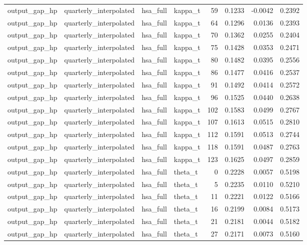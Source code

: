 \begin{tabular}{llllrrrr}
output\_gap\_hp & quarterly\_interpolated & hsa\_full & kappa\_t & 59 & 0.1233 & -0.0042 & 0.2392 \\
output\_gap\_hp & quarterly\_interpolated & hsa\_full & kappa\_t & 64 & 0.1296 & 0.0136 & 0.2393 \\
output\_gap\_hp & quarterly\_interpolated & hsa\_full & kappa\_t & 70 & 0.1362 & 0.0255 & 0.2404 \\
output\_gap\_hp & quarterly\_interpolated & hsa\_full & kappa\_t & 75 & 0.1428 & 0.0353 & 0.2471 \\
output\_gap\_hp & quarterly\_interpolated & hsa\_full & kappa\_t & 80 & 0.1482 & 0.0395 & 0.2556 \\
output\_gap\_hp & quarterly\_interpolated & hsa\_full & kappa\_t & 86 & 0.1477 & 0.0416 & 0.2537 \\
output\_gap\_hp & quarterly\_interpolated & hsa\_full & kappa\_t & 91 & 0.1492 & 0.0414 & 0.2572 \\
output\_gap\_hp & quarterly\_interpolated & hsa\_full & kappa\_t & 96 & 0.1525 & 0.0440 & 0.2638 \\
output\_gap\_hp & quarterly\_interpolated & hsa\_full & kappa\_t & 102 & 0.1583 & 0.0499 & 0.2767 \\
output\_gap\_hp & quarterly\_interpolated & hsa\_full & kappa\_t & 107 & 0.1613 & 0.0515 & 0.2810 \\
output\_gap\_hp & quarterly\_interpolated & hsa\_full & kappa\_t & 112 & 0.1591 & 0.0513 & 0.2744 \\
output\_gap\_hp & quarterly\_interpolated & hsa\_full & kappa\_t & 118 & 0.1591 & 0.0487 & 0.2763 \\
output\_gap\_hp & quarterly\_interpolated & hsa\_full & kappa\_t & 123 & 0.1625 & 0.0497 & 0.2859 \\
output\_gap\_hp & quarterly\_interpolated & hsa\_full & theta\_t & 0 & 0.2228 & 0.0057 & 0.5198 \\
output\_gap\_hp & quarterly\_interpolated & hsa\_full & theta\_t & 5 & 0.2235 & 0.0110 & 0.5210 \\
output\_gap\_hp & quarterly\_interpolated & hsa\_full & theta\_t & 11 & 0.2221 & 0.0122 & 0.5166 \\
output\_gap\_hp & quarterly\_interpolated & hsa\_full & theta\_t & 16 & 0.2199 & 0.0084 & 0.5173 \\
output\_gap\_hp & quarterly\_interpolated & hsa\_full & theta\_t & 21 & 0.2181 & 0.0044 & 0.5182 \\
output\_gap\_hp & quarterly\_interpolated & hsa\_full & theta\_t & 27 & 0.2171 & 0.0073 & 0.5160 \\

\end{tabular}
